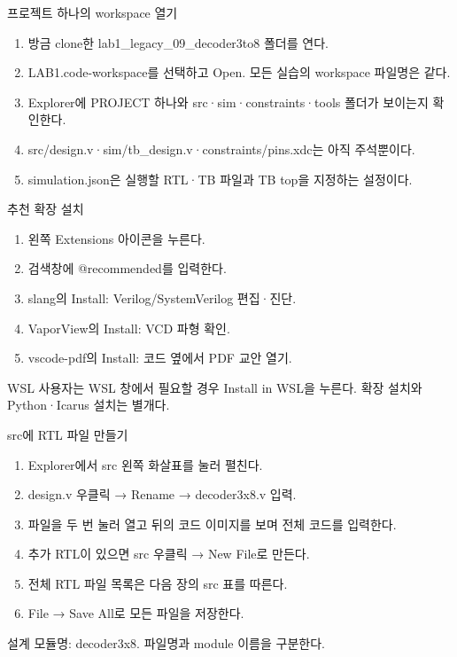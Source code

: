 \begin{frame}{프로젝트 하나의 workspace 열기}\relax
\small
\begin{enumerate}\setlength{\itemsep}{0.22cm}
\item 방금 clone한 lab1\_legacy\_09\_decoder3to8 폴더를 연다.
\item LAB1.code-workspace를 선택하고 Open. 모든 실습의 workspace 파일명은 같다.
\item Explorer에 PROJECT 하나와 src·sim·constraints·tools 폴더가 보이는지 확인한다.
\item src/design.v·sim/tb\_design.v·constraints/pins.xdc는 아직 주석뿐이다.
\item simulation.json은 실행할 RTL·TB 파일과 TB top을 지정하는 설정이다.
\end{enumerate}

\end{frame}

\begin{frame}{추천 확장 설치}\relax
\small
\begin{enumerate}\setlength{\itemsep}{0.22cm}
\item 왼쪽 Extensions 아이콘을 누른다.
\item 검색창에 @recommended를 입력한다.
\item slang의 Install: Verilog/SystemVerilog 편집·진단.
\item VaporView의 Install: VCD 파형 확인.
\item vscode-pdf의 Install: 코드 옆에서 PDF 교안 열기.
\end{enumerate}
WSL 사용자는 WSL 창에서 필요할 경우 Install in WSL을 누른다. 확장 설치와 Python·Icarus 설치는 별개다.\par
\end{frame}

\begin{frame}{src에 RTL 파일 만들기}\relax
\small
\begin{enumerate}\setlength{\itemsep}{0.22cm}
\item Explorer에서 src 왼쪽 화살표를 눌러 펼친다.
\item design.v 우클릭 → Rename → decoder3x8.v 입력.
\item 파일을 두 번 눌러 열고 뒤의 코드 이미지를 보며 전체 코드를 입력한다.
\item 추가 RTL이 있으면 src 우클릭 → New File로 만든다.
\item 전체 RTL 파일 목록은 다음 장의 src 표를 따른다.
\item File → Save All로 모든 파일을 저장한다.
\end{enumerate}
설계 모듈명: decoder3x8. 파일명과 module 이름을 구분한다.\par
\end{frame}

